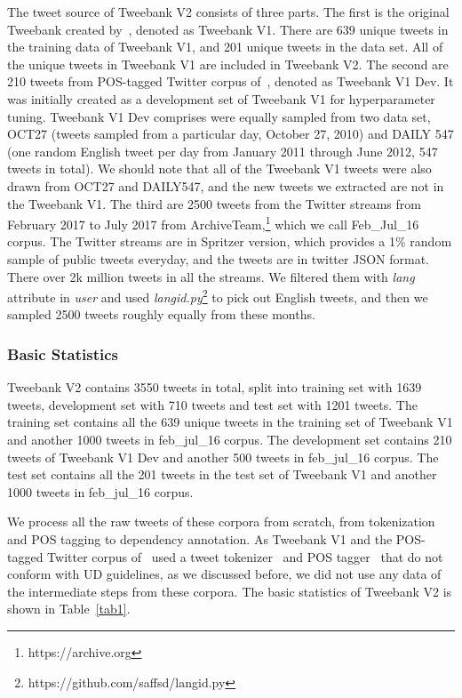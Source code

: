 \documentclass[11pt,letterpaper]{article}
\begin{document}
The tweet source of Tweebank V2 consists of three parts. 
The first is the original Tweebank created by~\cite{kong-EtAl:2014:EMNLP2014}, denoted as Tweebank V1.  There are 639 unique tweets in the training data of Tweebank V1, and 201 unique tweets in the data set. All of the unique tweets in Tweebank V1 are included in Tweebank V2.
The second are 210 tweets from POS-tagged Twitter corpus of~, denoted as Tweebank V1 Dev. It was initially created as a development set of Tweebank V1 for hyperparameter tuning.
Tweebank V1 Dev comprises were equally sampled from two data set, OCT27 (tweets sampled from a particular day, October 27, 2010) and DAILY 547 (one random English tweet per day from January 2011 through June 2012, 547 tweets in total). We should note that all of the Tweebank V1 tweets were also drawn from OCT27 and DAILY547, and the new tweets we extracted are not in the Tweebank V1.
The third are 2500 tweets from the Twitter streams from February 2017 to July 2017 from ArchiveTeam,\footnote{https://archive.org} which we call Feb\_Jul\_16 corpus. The Twitter streams are in Spritzer version, which provides a 1\% random sample of public tweets everyday, and the tweets are in twitter JSON format. 
There over 2k million tweets in all the streams. We filtered them with \textit{lang} attribute in \textit{user} and used \textit{langid.py}\footnote{https://github.com/saffsd/langid.py} to pick out English tweets, and then we sampled 2500 tweets roughly equally from these months.


\subsubsection{Basic Statistics}
Tweebank V2 contains 3550 tweets in total, split into training set with 1639 tweets, development set with 710 tweets and test set with 1201 tweets. 
The training set contains all the 639 unique tweets in the training set of Tweebank V1 and another 1000 tweets in feb\_jul\_16 corpus.
The development set contains 210 tweets of Tweebank V1 Dev and another 500 tweets in feb\_jul\_16 corpus.
The test set contains all the 201 tweets in the test set of Tweebank V1 and another 1000 tweets in feb\_jul\_16 corpus.

We process all the raw tweets of these corpora from scratch, from tokenization and POS tagging to dependency annotation. As Tweebank V1 and the POS-tagged Twitter corpus of~ used a tweet tokenizer~\cite{Krieger10tweetmotif:exploratory} and POS tagger~\cite{Gimpel:2011:PTT:2002736.2002747} that do not conform with UD guidelines, as we discussed before, we did not use any data of the intermediate steps from these corpora. The basic statistics of Tweebank V2 is shown in Table~\ref{tab1}.
\end{document}
